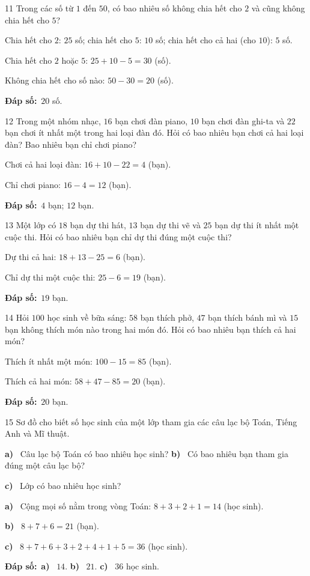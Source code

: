 \documentclass[11pt]{article}
\newif\ifsol \solfalse
\providecommand{\AnsWord}{Đáp số}
\newcommand{\dapso}[1]{\par\textbf{\AnsWord:}\ #1}
\newcommand{\probsol}[1]{%
  \begin{lrbox}{\solmeasure}\begin{minipage}{\dimexpr\linewidth-24pt\relax}#1\end{minipage}\end{lrbox}%
  \ifsol
    \begin{solbox}#1\end{solbox}%
  \else
    \setlength{\solht}{\dimexpr\ht\solmeasure+\dp\solmeasure+0.85cm\relax}%
    \ifdim\solht<1.35cm\setlength{\solht}{1.35cm}\fi
    \begin{tcolorbox}[colback=white,colframe=Line,boxrule=0.8pt,arc=5pt,
      left=8pt,right=8pt,top=4pt,bottom=4pt,height=\solht]{\footnotesize\color{Slate}\itshape\WorkWord}\end{tcolorbox}%
  \fi}
\newcommand{\pa}[1]{\textbf{#1)}\ }
\newcommand{\gap}{\vspace{0.3cm}}
\def\WorkWord{Bài làm:}
\def\AnsWord{Đáp số}
\begin{document}
\gap
\begin{probbox}{11}{\relax}
Trong các số từ $1$ đến $50$, có bao nhiêu số không chia hết cho $2$ và cũng không chia hết cho $5$?
\end{probbox}
\probsol{
Chia hết cho $2$: $25$ số; chia hết cho $5$: $10$ số; chia hết cho cả hai (cho $10$): $5$ số.\par
Chia hết cho $2$ hoặc $5$: $25+10-5=30$ (số).\par Không chia hết cho số nào: $50-30=20$ (số).
\dapso{$20$ số.}}
\gap
\begin{probbox}{12}{\relax}
Trong một nhóm nhạc, $16$ bạn chơi đàn piano, $10$ bạn chơi đàn ghi-ta và $22$ bạn chơi ít nhất một trong hai loại đàn đó. Hỏi có bao nhiêu bạn chơi cả hai loại đàn? Bao nhiêu bạn chỉ chơi piano?
\end{probbox}
\probsol{
Chơi cả hai loại đàn: $16+10-22=4$ (bạn).\par Chỉ chơi piano: $16-4=12$ (bạn).
\dapso{$4$ bạn; $12$ bạn.}}
\gap
\begin{probbox}{13}{\relax}
Một lớp có $18$ bạn dự thi hát, $13$ bạn dự thi vẽ và $25$ bạn dự thi ít nhất một cuộc thi. Hỏi có bao nhiêu bạn chỉ dự thi đúng một cuộc thi?
\end{probbox}
\probsol{
Dự thi cả hai: $18+13-25=6$ (bạn).\par Chỉ dự thi một cuộc thi: $25-6=19$ (bạn).
\dapso{$19$ bạn.}}
\gap
\begin{probbox}{14}{\relax}
Hỏi $100$ học sinh về bữa sáng: $58$ bạn thích phở, $47$ bạn thích bánh mì và $15$ bạn không thích món nào trong hai món đó. Hỏi có bao nhiêu bạn thích cả hai món?
\end{probbox}
\probsol{
Thích ít nhất một món: $100-15=85$ (bạn).\par Thích cả hai món: $58+47-85=20$ (bạn).
\dapso{$20$ bạn.}}
\gap
\needspace{7.5cm}
\begin{probbox}{15}{\relax}
Sơ đồ cho biết số học sinh của một lớp tham gia các câu lạc bộ Toán, Tiếng Anh và Mĩ thuật.
\begin{center}
\end{center}
\pa{a} Câu lạc bộ Toán có bao nhiêu học sinh? \quad \pa{b} Có bao nhiêu bạn tham gia đúng một câu lạc bộ?\par
\pa{c} Lớp có bao nhiêu học sinh?
\end{probbox}
\probsol{
\pa{a} Cộng mọi số nằm trong vòng Toán: $8+3+2+1=14$ (học sinh).\par
\pa{b} $8+7+6=21$ (bạn).\par
\pa{c} $8+7+6+3+2+4+1+5=36$ (học sinh).
\dapso{\pa{a} $14$. \pa{b} $21$. \pa{c} $36$ học sinh.}}
\end{document}

